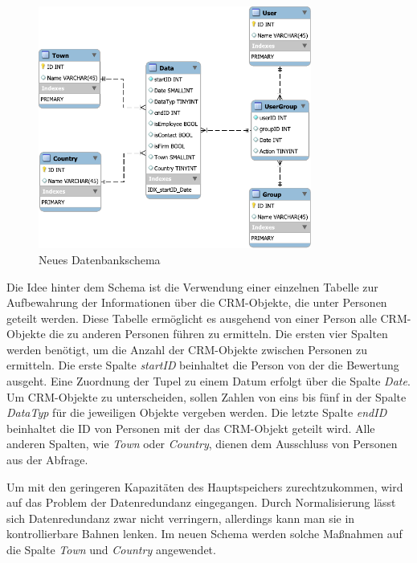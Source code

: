 \begin{figure}[htbp]
\centering
  \includegraphics[width=0.8\textwidth, width=0.8\textwidth]{pics/NewSchema.pdf}
\caption{Neues Datenbankschema}
\label{konzept_SchemaNeu}
\end{figure} 

Die Idee hinter dem Schema ist die Verwendung einer einzelnen Tabelle zur Aufbewahrung der Informationen über die CRM-Objekte, die unter Personen geteilt werden. Diese Tabelle ermöglicht es ausgehend von einer Person alle CRM-Objekte die zu anderen Personen führen zu ermitteln. Die ersten vier Spalten werden benötigt, um die Anzahl der CRM-Objekte zwischen Personen zu ermitteln. Die erste Spalte \textit{startID} beinhaltet die Person von der die Bewertung ausgeht. Eine Zuordnung der Tupel zu einem Datum erfolgt über die Spalte \textit{Date}. Um CRM-Objekte zu unterscheiden, sollen Zahlen von eins bis fünf in der Spalte \textit{DataTyp} für die jeweiligen Objekte vergeben werden. Die letzte Spalte \textit{endID} beinhaltet die ID von Personen mit der das CRM-Objekt geteilt wird. Alle anderen Spalten, wie \textit{Town} oder \textit{Country}, dienen dem Ausschluss von Personen aus der Abfrage.

Um mit den geringeren Kapazitäten des Hauptspeichers zurechtzukommen, wird auf das Problem der Datenredundanz eingegangen. Durch Normalisierung lässt sich Datenredundanz zwar nicht verringern, allerdings kann man sie in kontrollierbare Bahnen lenken. Im neuen Schema werden solche Maßnahmen auf die Spalte \textit{Town} und \textit{Country} angewendet. 


